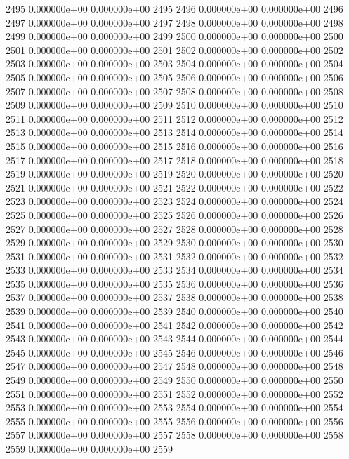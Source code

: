 \documentclass{article}
\begin{document}
\begin{Schunk}
\begin{Soutput}
2495   0.000000e+00   0.000000e+00 2495
2496   0.000000e+00   0.000000e+00 2496
2497   0.000000e+00   0.000000e+00 2497
2498   0.000000e+00   0.000000e+00 2498
2499   0.000000e+00   0.000000e+00 2499
2500   0.000000e+00   0.000000e+00 2500
2501   0.000000e+00   0.000000e+00 2501
2502   0.000000e+00   0.000000e+00 2502
2503   0.000000e+00   0.000000e+00 2503
2504   0.000000e+00   0.000000e+00 2504
2505   0.000000e+00   0.000000e+00 2505
2506   0.000000e+00   0.000000e+00 2506
2507   0.000000e+00   0.000000e+00 2507
2508   0.000000e+00   0.000000e+00 2508
2509   0.000000e+00   0.000000e+00 2509
2510   0.000000e+00   0.000000e+00 2510
2511   0.000000e+00   0.000000e+00 2511
2512   0.000000e+00   0.000000e+00 2512
2513   0.000000e+00   0.000000e+00 2513
2514   0.000000e+00   0.000000e+00 2514
2515   0.000000e+00   0.000000e+00 2515
2516   0.000000e+00   0.000000e+00 2516
2517   0.000000e+00   0.000000e+00 2517
2518   0.000000e+00   0.000000e+00 2518
2519   0.000000e+00   0.000000e+00 2519
2520   0.000000e+00   0.000000e+00 2520
2521   0.000000e+00   0.000000e+00 2521
2522   0.000000e+00   0.000000e+00 2522
2523   0.000000e+00   0.000000e+00 2523
2524   0.000000e+00   0.000000e+00 2524
2525   0.000000e+00   0.000000e+00 2525
2526   0.000000e+00   0.000000e+00 2526
2527   0.000000e+00   0.000000e+00 2527
2528   0.000000e+00   0.000000e+00 2528
2529   0.000000e+00   0.000000e+00 2529
2530   0.000000e+00   0.000000e+00 2530
2531   0.000000e+00   0.000000e+00 2531
2532   0.000000e+00   0.000000e+00 2532
2533   0.000000e+00   0.000000e+00 2533
2534   0.000000e+00   0.000000e+00 2534
2535   0.000000e+00   0.000000e+00 2535
2536   0.000000e+00   0.000000e+00 2536
2537   0.000000e+00   0.000000e+00 2537
2538   0.000000e+00   0.000000e+00 2538
2539   0.000000e+00   0.000000e+00 2539
2540   0.000000e+00   0.000000e+00 2540
2541   0.000000e+00   0.000000e+00 2541
2542   0.000000e+00   0.000000e+00 2542
2543   0.000000e+00   0.000000e+00 2543
2544   0.000000e+00   0.000000e+00 2544
2545   0.000000e+00   0.000000e+00 2545
2546   0.000000e+00   0.000000e+00 2546
2547   0.000000e+00   0.000000e+00 2547
2548   0.000000e+00   0.000000e+00 2548
2549   0.000000e+00   0.000000e+00 2549
2550   0.000000e+00   0.000000e+00 2550
2551   0.000000e+00   0.000000e+00 2551
2552   0.000000e+00   0.000000e+00 2552
2553   0.000000e+00   0.000000e+00 2553
2554   0.000000e+00   0.000000e+00 2554
2555   0.000000e+00   0.000000e+00 2555
2556   0.000000e+00   0.000000e+00 2556
2557   0.000000e+00   0.000000e+00 2557
2558   0.000000e+00   0.000000e+00 2558
2559   0.000000e+00   0.000000e+00 2559

\end{Soutput}
\end{Schunk}
\end{document}
